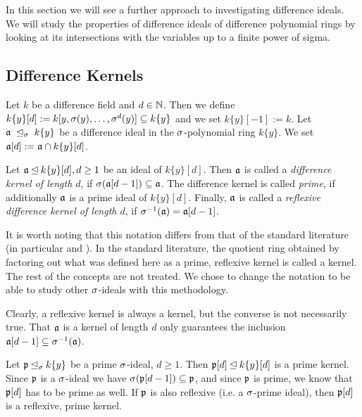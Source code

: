 In this section we will see a further approach to investigating difference ideals. We will study the properties of difference ideals of difference polynomial rings by looking at its intersections with the variables up to a finite power of sigma.

\subsection{Difference Kernels}


\begin{defn}
Let $k$ be a difference field and $d \in \mathbb{N}$. Then we define $k\{y\}[d]:= k[y,\sigma(y),\ldots,\sigma^d(y)] \subseteq k\{y\}$ and we set $k\{y\}[-1] := k$. Let $\mathfrak{a}~\unlhd_{\sigma}~k\{y\}$ be a difference ideal in the $\sigma$-polynomial ring $k\{y\}$. 
We set $\mathfrak{a}[d] := \mathfrak{a} \cap k\{y\}[d]$.
\end{defn}


\begin{defn}
Let $\mathfrak{a} \unlhd k\{y\}[d], d \geq 1$ be an ideal of $k\{y\}[d]$. Then $\mathfrak{a}$ is called a \emph{difference kernel of length $d$}, if $\sigma(\mathfrak{a}[d-1]) \subseteq \mathfrak{a}$. The difference kernel is called \emph{prime}, if additionally $\mathfrak{a}$ is a prime ideal of $k\{y\}[d]$.
Finally, $\mathfrak{a}$ is called a \emph{reflexive difference kernel of length $d$}, if $\sigma^{-1}(\mathfrak{a}) = \mathfrak{a}[d-1]$.   
\end{defn}

It is worth noting that this notation differs from that of the standard literature (in particular \cite{cohn} and \cite{levin}). In the standard literature, the quotient ring obtained by factoring out 
what was defined here as a prime, reflexive kernel is called a kernel. The rest of the concepts are not treated. We chose to change the notation to be able to study other $\sigma$-ideals with this methodology.

\begin{rem}
Clearly, a reflexive kernel is always a kernel, but the converse is not necessarily true. That $\mathfrak{a}$ is a kernel of length $d$ only guarantees the inclusion $\mathfrak{a}[d-1] \subseteq \sigma^{-1}(\mathfrak{a})$.
\end{rem}

\begin{ex}
Let $\mathfrak{p} \unlhd_{\sigma} k\{y\}$ be a prime $\sigma$-ideal, $d \geq 1$. Then $\mathfrak{p}[d] \unlhd k\{y\}[d]$ is a prime kernel. Since $\mathfrak{p}$ is a $\sigma$-ideal we have $\sigma(\mathfrak{p}[d-1]) \subseteq \mathfrak{p}$, 
and since $\mathfrak{p}$ is prime, we know that $\mathfrak{p}[d]$ has to be prime as well. If $\mathfrak{p}$ is also reflexive (i.e. a $\sigma$-prime ideal), then $\mathfrak{p}[d]$ is a reflexive, prime kernel. 
\end{ex}


